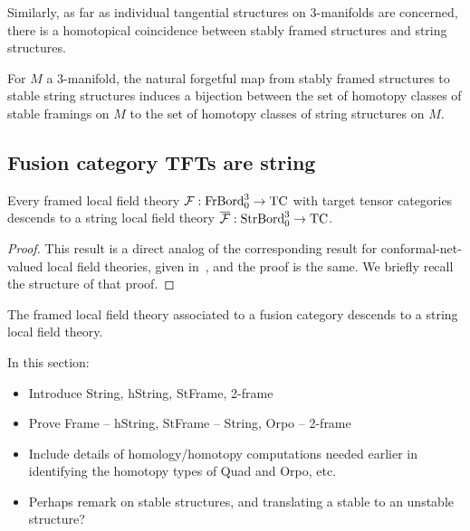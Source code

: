 \documentclass{amsart}
\begin{document}

Similarly, as far as individual tangential structures on 3-manifolds are concerned, there is a homotopical coincidence between stably framed structures and string structures.
\begin{proposition}
For $M$ a 3-manifold, the natural forgetful map from stably framed structures to stable string structures induces a bijection between the set of homotopy classes of stable framings on $M$ to the set of homotopy classes of string structures on $M$.
\end{proposition}

\subsection{Fusion category TFTs are string} \label{sec-pivot-string}

\begin{proposition} \label{prop-string}
Every framed local field theory $\mathcal F : \mathrm{FrBord}_0^3 \rightarrow \mathrm{TC}$ with target tensor categories descends to a string local field theory $\overline{\mathcal F} : \mathrm{StrBord}_0^3 \rightarrow \mathrm{TC}$.
\end{proposition}

\begin{proof}
This result is a direct analog of the corresponding result for conformal-net-valued local field theories, given in~\cite{bdh-lft}, and the proof is the same.  We briefly recall the structure of that proof.  
\end{proof}


\begin{corollary}
The framed local field theory associated to a fusion category descends to a string local field theory.
\end{corollary}



In this section:
\begin{itemize}
\item Introduce String, hString, StFrame, 2-frame
\item Prove Frame -- hString, StFrame -- String, Orpo -- 2-frame
\item Include details of homology/homotopy computations needed earlier in identifying the homotopy types of Quad and Orpo, etc.
\item Perhaps remark on stable structures, and translating a stable to an unstable structure?
\end{itemize}
\end{document}
